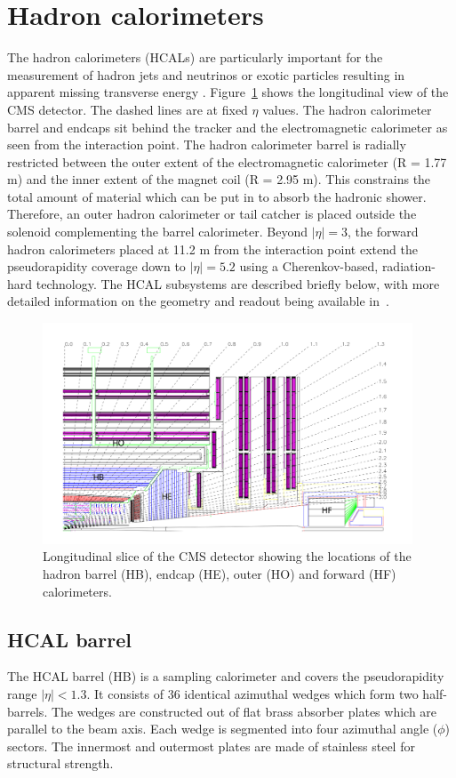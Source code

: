 \section{Hadron calorimeters}
The hadron calorimeters (HCALs) are particularly important for the measurement of hadron jets and neutrinos or exotic particles resulting in apparent missing transverse energy \cite{CMSTDR}.
Figure~\ref{fig:hcalslice} shows the longitudinal view of the CMS detector. The dashed lines are at fixed $\eta$ values. 
The hadron calorimeter barrel and endcaps sit behind the tracker and the electromagnetic
calorimeter as seen from the interaction point. The hadron calorimeter barrel is radially restricted
between the outer extent of the electromagnetic calorimeter (R = 1.77 m) and the inner extent of
the magnet coil (R = 2.95 m). This constrains the total amount of material which can be put in
to absorb the hadronic shower. Therefore, an outer hadron calorimeter or tail catcher is placed
outside the solenoid complementing the barrel calorimeter. Beyond $|\eta| = 3$, the forward hadron
calorimeters placed at 11.2 m from the interaction point extend the pseudorapidity coverage down
to $|\eta| = 5.2$ using a Cherenkov-based, radiation-hard technology.
The HCAL subsystems are described briefly below, with more detailed information on the geometry and 
readout being available in~\cite{CMSTDR}.
\begin{figure}
\centering
\includegraphics[width=0.98\textwidth,natwidth=1793,natheight=1074]{figures/hcalslice.png}
\caption{Longitudinal slice of the CMS detector showing the locations of the hadron barrel
(HB), endcap (HE), outer (HO) and forward (HF) calorimeters.}
\label{fig:hcalslice}
\end{figure}

\subsection{HCAL barrel}
The HCAL barrel (HB) is a sampling calorimeter and covers the pseudorapidity range $|\eta| < 1.3$.
It consists of 36 identical azimuthal wedges which form two half-barrels. 
The wedges are constructed out of flat brass absorber plates which are parallel
to the beam axis.  Each wedge is segmented into four azimuthal angle ($\phi$) sectors. 
The innermost and outermost plates are made of stainless steel for structural strength.

